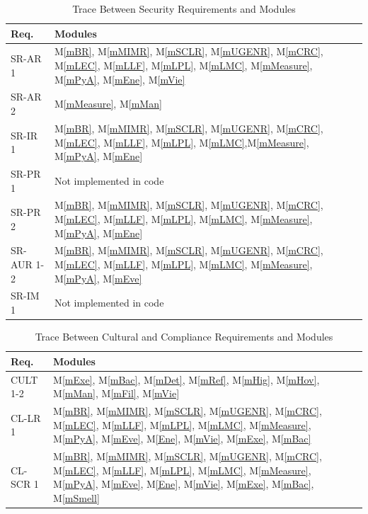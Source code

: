 \documentclass[12pt, titlepage]{article}
\newcommand{\mref}[1]{M\ref{#1}}
\begin{document}
\begin{table}[H]
  \centering
  \begin{tabular}{p{} p{}}
    \toprule \textbf{Req.} & \textbf{Modules}\\
    \midrule
    SR-AR 1 & \mref{mBR}, \mref{mMIMR}, \mref{mSCLR}, \mref{mUGENR}, \mref{mCRC}, \mref{mLEC}, \mref{mLLF}, \mref{mLPL}, \mref{mLMC}, \mref{mMeasure}, \mref{mPyA}, \mref{mEne}, \mref{mVie} \\
    SR-AR 2 & \mref{mMeasure}, \mref{mMan} \\
    SR-IR 1 & \mref{mBR}, \mref{mMIMR}, \mref{mSCLR}, \mref{mUGENR}, \mref{mCRC}, \mref{mLEC}, \mref{mLLF}, \mref{mLPL}, \mref{mLMC},\mref{mMeasure}, \mref{mPyA}, \mref{mEne} \\
    SR-PR 1 & Not implemented in code \\
    SR-PR 2 & \mref{mBR}, \mref{mMIMR}, \mref{mSCLR}, \mref{mUGENR}, \mref{mCRC}, \mref{mLEC}, \mref{mLLF}, \mref{mLPL}, \mref{mLMC}, \mref{mMeasure}, \mref{mPyA}, \mref{mEne} \\
    SR-AUR 1-2 & \mref{mBR}, \mref{mMIMR}, \mref{mSCLR}, \mref{mUGENR}, \mref{mCRC}, \mref{mLEC}, \mref{mLLF}, \mref{mLPL}, \mref{mLMC}, \mref{mMeasure}, \mref{mPyA}, \mref{mEve} \\
    SR-IM 1 & Not implemented in code \\
    \bottomrule
  \end{tabular}
  \caption{Trace Between Security Requirements and Modules}
  \label{tab:SR-mod}
\end{table}

\begin{table}[H]
  \centering
  \begin{tabular}{p{} p{}}
    \toprule \textbf{Req.} & \textbf{Modules}\\
    \midrule
    CULT 1-2 & \mref{mExe}, \mref{mBac}, \mref{mDet}, \mref{mRef}, \mref{mHig}, \mref{mHov}, \mref{mMan}, \mref{mFil}, \mref{mVie} \\
    CL-LR 1 & \mref{mBR}, \mref{mMIMR}, \mref{mSCLR}, \mref{mUGENR}, \mref{mCRC}, \mref{mLEC}, \mref{mLLF}, \mref{mLPL}, \mref{mLMC}, \mref{mMeasure}, \mref{mPyA}, \mref{mEve}, \mref{Ene}, \mref{mVie}, \mref{mExe}, \mref{mBac} \\
    CL-SCR 1 & \mref{mBR}, \mref{mMIMR}, \mref{mSCLR}, \mref{mUGENR}, \mref{mCRC}, \mref{mLEC}, \mref{mLLF}, \mref{mLPL}, \mref{mLMC}, \mref{mMeasure}, \mref{mPyA}, \mref{mEve}, \mref{Ene}, \mref{mVie}, \mref{mExe}, \mref{mBac}, \mref{mSmell} \\ 
    \bottomrule
  \end{tabular}
  \caption{Trace Between Cultural and Compliance Requirements and Modules}
  \label{tab:CUL-COMP-mod}
\end{table}
\end{document}

